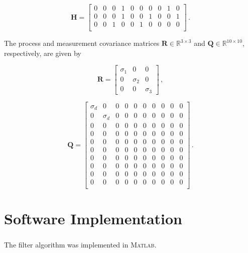 \begin{equation}
\mathbf{H} = \begin{bmatrix}
  0 & 0 & 0 & 1 & 0 & 0 & 0 & 0 & 1 & 0\\
  0 & 0 & 0 & 1 & 0 & 0 & 1 & 0 & 0 & 1\\
  0 & 0 & 1 & 0 & 0 & 1 & 0 & 0 & 0 & 0\\
\end{bmatrix}\,.
\end{equation}

The process and measurement covariance matrices $\mathbf{R} \in \mathbb{R}^{3 \times 3}$ and $\mathbf{Q} \in \mathbb{R}^{10 \times 10}$, respectively, are given by

\begin{equation}
\mathbf{R} = \begin{bmatrix}
  \sigma_1 & 0 & 0\\
  0 & \sigma_2 & 0\\
  0 & 0 & \sigma_3
\end{bmatrix}\,,
\end{equation}

\begin{equation}
\mathbf{Q} = \begin{bmatrix}
  \sigma_d & 0 & 0 & 0 & 0 & 0 & 0 & 0 & 0 & 0\\
  0 & \sigma_d & 0 & 0 & 0 & 0 & 0 & 0 & 0 & 0\\
  0 & 0 & 0 & 0 & 0 & 0 & 0 & 0 & 0 & 0\\
  0 & 0 & 0 & 0 & 0 & 0 & 0 & 0 & 0 & 0\\
  0 & 0 & 0 & 0 & 0 & 0 & 0 & 0 & 0 & 0\\
  0 & 0 & 0 & 0 & 0 & 0 & 0 & 0 & 0 & 0\\
  0 & 0 & 0 & 0 & 0 & 0 & 0 & 0 & 0 & 0\\
  0 & 0 & 0 & 0 & 0 & 0 & 0 & 0 & 0 & 0\\
  0 & 0 & 0 & 0 & 0 & 0 & 0 & 0 & 0 & 0\\
  0 & 0 & 0 & 0 & 0 & 0 & 0 & 0 & 0 & 0\\
\end{bmatrix}\,.
\end{equation}

\section{Software Implementation}

The filter algorithm was implemented in \textsc{Matlab}\textsuperscript{\textregistered}.

